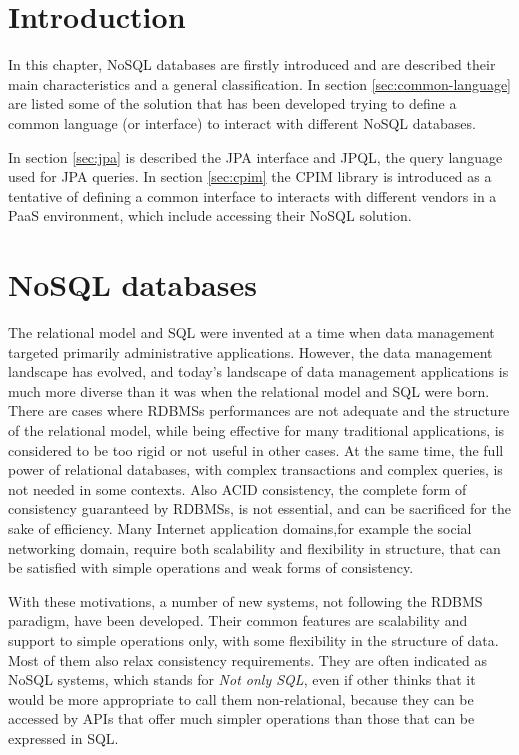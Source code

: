 \section{Introduction}
In this chapter, NoSQL databases are firstly introduced and are described their main characteristics and a general classification. In section \ref{sec:common-language} are listed some of the solution that has been developed trying to define a common language (or interface) to interact with different NoSQL databases.

\noindent In section \ref{sec:jpa} is described the JPA interface and JPQL, the query language used for JPA queries. In section \ref{sec:cpim} the CPIM library is introduced as a tentative of defining a common interface to interacts with different vendors in a PaaS environment, which include accessing their NoSQL solution.

\section{NoSQL databases}
\label{sec:nosql}
The relational model and SQL were invented at a time when data management targeted primarily administrative applications. However, the data management landscape has evolved, and today's landscape of data management applications is much more diverse than it was when the relational model and SQL were born.
There are cases where RDBMSs performances are not adequate and the structure of the relational model, while being effective for many traditional applications, is considered to be too rigid or not useful in other cases.
At the same time, the full power of relational databases, with complex transactions and complex queries, is not needed in some contexts. Also ACID consistency, the complete form of consistency guaranteed by RDBMSs, is not essential, and can be sacrificed for the sake of efficiency. 
Many Internet application domains,for example the social networking domain, require both scalability and flexibility in structure, that can be satisfied with simple operations and weak forms of consistency.

\newparagraph With these motivations, a number of new systems, not following the RDBMS paradigm, have been developed. Their common features are scalability and support to simple operations only, with some flexibility in the structure of data. Most of them also relax consistency requirements. They are often indicated as NoSQL systems, which stands for \textit{Not only SQL}, even if other thinks that it would be more appropriate to call them non-relational,  because they can be accessed by APIs that offer much simpler operations than those that can be expressed in SQL. 

